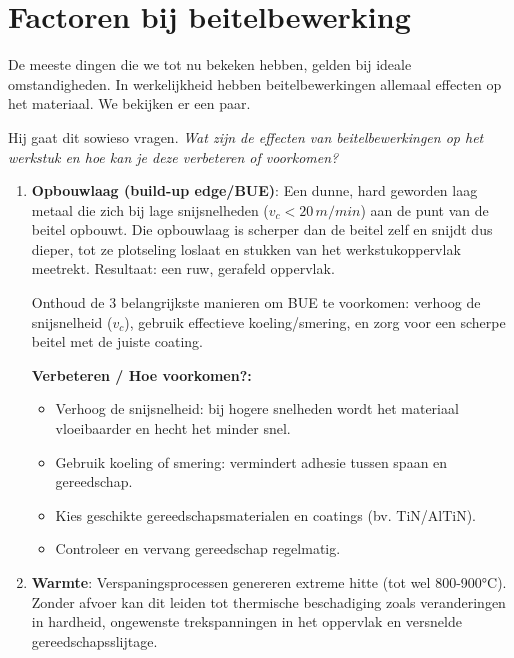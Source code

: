 \documentclass[a4paper,11pt,twoside]{report}
\begin{document}
\section{Factoren bij beitelbewerking}
De meeste dingen die we tot nu bekeken hebben, gelden bij ideale omstandigheden.
In werkelijkheid hebben beitelbewerkingen allemaal effecten op het materiaal. We bekijken er een paar.
\begin{examenbox}
    Hij gaat dit sowieso vragen. \textit{Wat zijn de effecten van beitelbewerkingen op het werkstuk en hoe kan je deze verbeteren of voorkomen?}
\end{examenbox}
\begin{enumerate}
    \item \textbf{Opbouwlaag (build-up edge/BUE)}:
          Een dunne, hard geworden laag metaal die zich bij lage snijsnelheden ($v_c < 20\,\si{m/min}$) aan de punt van de beitel opbouwt.
          Die opbouwlaag is scherper dan de beitel zelf en snijdt dus dieper, tot ze plotseling loslaat
          en stukken van het werkstukoppervlak meetrekt. Resultaat: een ruw, gerafeld oppervlak.

          \begin{examenbox}
              Onthoud de 3 belangrijkste manieren om BUE te voorkomen: verhoog de snijsnelheid ($v_c$),
              gebruik effectieve koeling/smering, en zorg voor een scherpe beitel met de juiste coating.
          \end{examenbox}

          \textbf{Verbeteren / Hoe voorkomen?:}
          \begin{itemize}
              \item Verhoog de snijsnelheid: bij hogere snelheden wordt het materiaal vloeibaarder en hecht het minder snel.
              \item Gebruik koeling of smering: vermindert adhesie tussen spaan en gereedschap.
              \item Kies geschikte gereedschapsmaterialen en coatings (bv. TiN/AlTiN).
              \item Controleer en vervang gereedschap regelmatig.
          \end{itemize}

    \item \textbf{Warmte}:
          Verspaningsprocessen genereren extreme hitte (tot wel 800-900°C).
          Zonder afvoer kan dit leiden tot thermische beschadiging zoals veranderingen in hardheid,
          ongewenste trekspanningen in het oppervlak en versnelde gereedschapsslijtage.


\end{enumerate}
\end{document}
